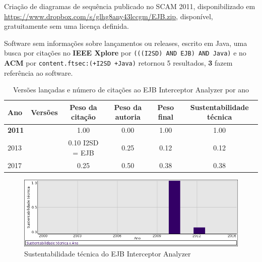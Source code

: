 Criação de diagramas de sequência
publicado no SCAM 2011,
disponibilizado em \url{https://www.dropbox.com/s/glhg8any43lccgm/EJB.zip},
disponível,
gratuitamente
sem uma licença definida.

Software sem informações sobre lançamentos ou releases,
escrito em Java,
uma busca por citações no {\bf IEEE Xplore} por
\texttt{(((I2SD) AND EJB) AND Java)}
e no {\bf ACM} por
\texttt{content.ftsec:(+I2SD +Java)}
retornou
5 resultados,
{\bf 3} fazem referência ao software.


\begin{table}[H]
\caption{Versões lançadas e número de citações ao EJB Interceptor Analyzer por ano}
\centering
\begin{tabular}{| l | c | c | c | c | c |}
  \hline
  Ano & Versões & Peso da citação & Peso da autoria & Peso final & Sustentabilidade técnica \\
  \hline
            {\bf 2011}
          &
          
          &
          1.00
          &
          0.00
          &
          1.00
          &
            {\color{blue} 1.00}
          \\
\hline
            2013
          &
          
          &
          0.10
            {\tiny I2SD = EJB}
          &
          0.25
          &
          0.12
          &
            {\color{red} 0.12}
          \\
\hline
            2017
          &
          
          &
          0.25
          &
          0.50
          &
          0.38
          &
            {\color{red} 0.38}
          \\
\hline
\end{tabular}
\end{table}

\begin{figure}[h]
  \center
  \includegraphics[scale=0.50]{result-documents/charts/ejb.png}
  \caption{Sustentabilidade técnica do EJB Interceptor Analyzer}
\end{figure}



